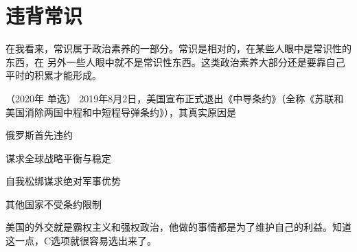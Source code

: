 \documentclass[lang=cn,newtx,10pt,scheme=chinese,pad,twocol]{zznote}
\begin{document}
\section{违背常识}

\begin{definition}
	在我看来，常识属于政治素养的一部分。常识是相对的，在某些人眼中是常识性的东西，在
	另外一些人眼中就不是常识性东西。这类政治素养大部分还是要靠自己平时的积累才能形成。
\end{definition}


\begin{example}  （2020年 单选）	2019年8月2日，美国宣布正式退出《中导条约》（全称《苏联和美国消除两国中程和中短程导弹条约》），其真实原因是
	\begin{choice}
		\item 俄罗斯首先违约
		\item 谋求全球战略平衡与稳定
		\item 自我松绑谋求绝对军事优势
		\item 其他国家不受条约限制
	\end{choice}

\end{example}
\begin{solution}
	美国的外交就是霸权主义和强权政治，他做的事情都是为了维护自己的利益。知道这一点，C选项就很容易选出来了。
\end{solution}
\end{document}
